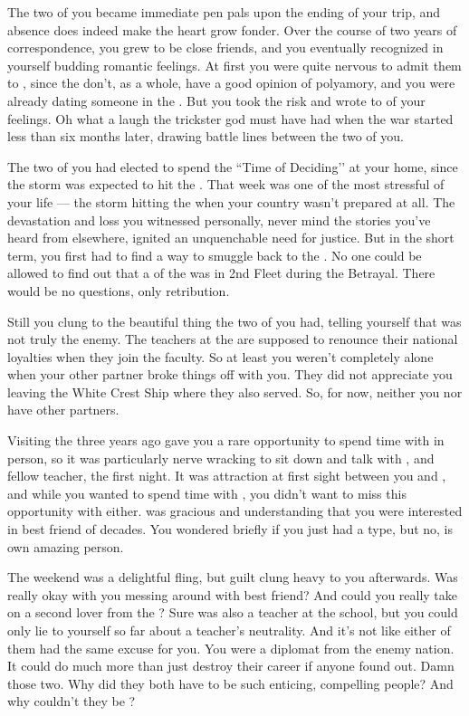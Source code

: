 \documentclass[char]{GL2020}
\begin{document}
The two of you became immediate pen pals upon the ending of your trip, and absence does indeed make the heart grow fonder. Over the course of two years of correspondence, you grew to be close friends, and you eventually recognized in yourself budding romantic feelings. At first you were quite nervous to admit them to \cBeetle{}, since the \pTech{} don’t, as a whole, have a good opinion of polyamory, and you were already dating someone in the \pShip{}. But you took the risk and wrote to \cBeetle{\them} of your feelings. Oh what a laugh the trickster god must have had when the war started less than six months later, drawing battle lines between the two of you. 

The two of you had elected to spend the ``Time of Deciding’’ at your home, since the storm was expected to hit the \pTech{}. That week was one of the most stressful of your life — the storm hitting the \pShip{} when your country wasn’t prepared at all. The devastation and loss you witnessed personally, never mind the stories you’ve heard from elsewhere, ignited an unquenchable need for justice. But in the short term, you first had to find a way to smuggle \cBeetle{} back to the \pSchool{}. No one could be allowed to find out that a \cBeetle{\cleric} of the \pTech{} was in 2nd Fleet during the Betrayal. There would be no questions, only retribution.

Still you clung to the beautiful thing the two of you had, telling yourself that \cBeetle{} was not truly the enemy. The teachers at the \pSc{} are supposed to renounce their national loyalties when they join the faculty. So at least you weren’t completely alone when your other partner broke things off with you. They did not appreciate you leaving the White Crest Ship where they also served. So, for now, neither you nor \cBeetle{} have other partners.

Visiting the \pSchool{} three years ago gave you a rare opportunity to spend time with \cBeetle{} in person, so it was particularly nerve wracking to sit down and talk with \cBeetle{}, and \cBeetle{\their} fellow teacher, \cEthics{\intro} the first night. It was attraction at first sight between you and \cEthics{}, and while you wanted to spend time with \cBeetle{}, you didn’t want to miss this opportunity with \cEthics{} either. \cBeetle{} was gracious and understanding that you were interested in \cBeetle{\their} best friend of decades. You wondered briefly if you just had a type, but no, \cEthics{} is \cEthics{\their} own amazing person. 

The weekend was a delightful fling, but guilt clung heavy to you afterwards. Was \cBeetle{} really okay with you messing around with \cBeetle{\their} best friend? And could you really take on a second lover from the \pTech{}? Sure \cEthics{} was also a teacher at the school, but you could only lie to yourself so far about a teacher’s neutrality. And it’s not like either of them had the same excuse for you. You were a diplomat from the enemy nation. It could do much more than just destroy their career if anyone found out. Damn those two. Why did they both have to be such enticing, compelling people? And why couldn’t they be \pShippies{}?
\end{document}
